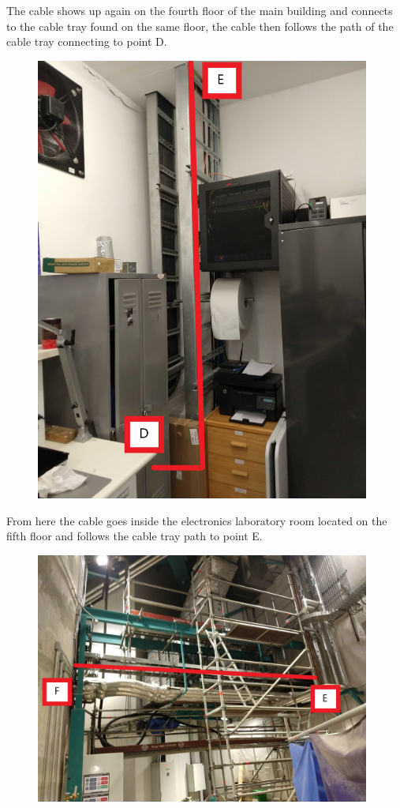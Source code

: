 The cable shows up again on the fourth floor of the main building and connects to the cable tray found on the same floor, the cable then follows the path of the cable tray connecting to point D.

\begin{figure}
  \includegraphics[width=11cm]{images/17.jpg}
  \centering
  \label{fig:jlsimon}
\end{figure}

From here the cable goes inside the electronics laboratory room located on the fifth floor and follows the cable tray path to point E.

\begin{figure}
  \includegraphics[width=11cm]{images/18.jpg}
  \centering
  \label{fig:jlsimon}
\end{figure}

